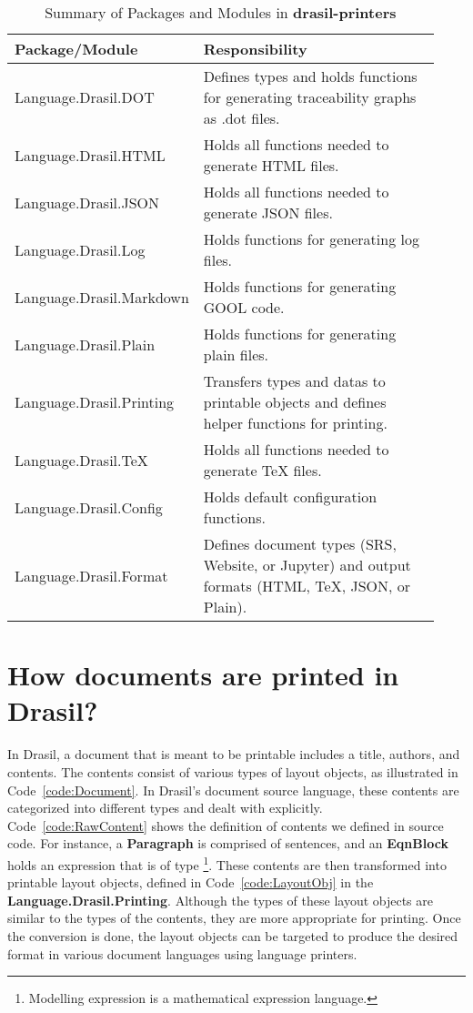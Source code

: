 \begin{longtable}[c]{|>{\raggedright}p{0.32\linewidth}|>{\raggedright\arraybackslash}p{0.61\linewidth}|}
	\caption{Summary of Packages and Modules in \textbf{drasil-printers}} 
	\label{tab:printerpacks}                                              
	\\ \hline
	
	\rowcolor{McMasterMediumGrey}
	\textbf{Package/Module} & \textbf{Responsibility}
	\\ \hline
	
	Language.Drasil.DOT & Defines types and holds functions for generating 
	traceability graphs as .dot files. 
	\\ \hline
	Language.Drasil.HTML & Holds all functions needed to generate HTML files. 
	\\ \hline
	Language.Drasil.JSON & Holds all functions needed to generate JSON files. 
	\\ \hline
	Language.Drasil.Log & Holds functions for generating log files. 
	\\ \hline
	Language.Drasil.Markdown & Holds functions for generating GOOL code.
	\\ \hline
	Language.Drasil.Plain & Holds functions for generating plain files.
	\\ \hline
	Language.Drasil.Printing & Transfers types and datas to printable objects 
	and defines helper functions for printing.
	\\ \hline
	Language.Drasil.TeX & Holds all functions needed to generate TeX files. 
	\\ \hline
	Language.Drasil.Config & Holds default configuration functions. 
	\\ \hline
	Language.Drasil.Format & Defines document types (SRS, Website, or Jupyter) 
	and output formats (HTML, TeX, JSON, or Plain).
	\\ \hline
\end{longtable}

\section{How documents are printed in Drasil?}
In Drasil, a document that is meant to be printable includes a title, authors, 
and contents. The contents consist of various types of layout objects, as 
illustrated in Code~\ref{code:Document}. In Drasil's document source language, 
these contents are categorized into different types and dealt with explicitly. 
Code~\ref{code:RawContent} shows the definition of contents we defined in 
source code. For instance, a \textbf{Paragraph} is comprised of sentences, and 
an \textbf{EqnBlock} holds an expression that is of type  
\footnote{Modelling expression is a mathematical expression language.}. These 
contents are then transformed into printable layout objects, defined in 
Code~\ref{code:LayoutObj} in the \textbf{Language.Drasil.Printing}. Although 
the types of these layout objects are similar to the types of the contents, 
they are more appropriate for printing. Once the conversion is done, the layout 
objects can be targeted to produce the desired format in various document 
languages using language printers.

